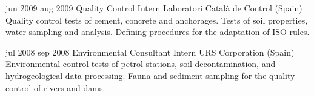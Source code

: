         \position
            {jun 2009 \textemdash{} aug 2009}
            {Quality Control Intern}
            {Laboratori Català de Control (Spain)}
            {Quality control tests of cement, concrete and anchorages. Tests of soil properties, water sampling and analysis. Defining procedures for the adaptation of ISO rules.}

        \position
            {jul 2008 \textemdash{} sep 2008}
            {Environmental Consultant Intern}
            {URS Corporation (Spain)}
            {Environmental control tests of petrol stations, soil decontamination, and hydrogeological data processing. Fauna and sediment sampling for the quality control of rivers and dams.}

\fi
